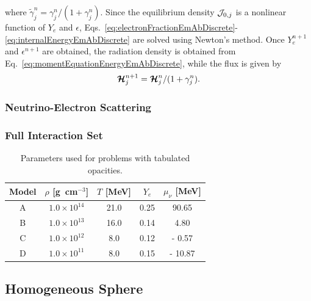 \documentclass[10pt,preprint]{aastex}
\begin{document}
where $\tilde{\gamma}_{j}^{n}=\gamma_{j}^{n}/(1+\gamma_{j}^{n})$.  
Since the equilibrium density $\mathcal{J}_{0,j}$ is a nonlinear function of $Y_{e}$ and $\epsilon$, Eqs.~\eqref{eq:electronFractionEmAbDiscrete}-\eqref{eq:internalEnergyEmAbDiscrete} are solved using Newton's method.  
Once $Y_{e}^{n+1}$ and $\epsilon^{n+1}$ are obtained, the radiation density is obtained from Eq.~\eqref{eq:momentEquationEnergyEmAbDiscrete}, while the flux is given by
\begin{equation}
  \boldsymbol{\mathcal{H}}_{j}^{n+1}=\boldsymbol{\mathcal{H}}_{j}^{n}/(1+\gamma_{j}^{n}).  
  \label{eq:momentEquationMomentumEmAbDiscrete}
\end{equation}

\subsubsection{Neutrino-Electron Scattering}

\subsubsection{Full Interaction Set}

\begin{table}
  \caption{Parameters used for problems with tabulated opacities. \label{tab:tabulatedModels}}
  \begin{tabular}{ccccc}
    Model & $\rho$ [g~cm$^{-3}$] & $T$ [MeV] & $Y_{e}$ & $\mu_{\nu}$ [MeV] \\
    \midrule \midrule
    A & $1.0\times10^{14}$ & 21.0  & 0.25 &   90.65 \\
    B & $1.0\times10^{13}$ & 16.0 & 0.14 &     4.80 \\
    C & $1.0\times10^{12}$ &   8.0 & 0.12 & -   0.57 \\
    D & $1.0\times10^{11}$ &   8.0 & 0.15 & - 10.87 \\
    \midrule \midrule
  \end{tabular}
\end{table}

\subsection{Homogeneous Sphere}
\end{document}
